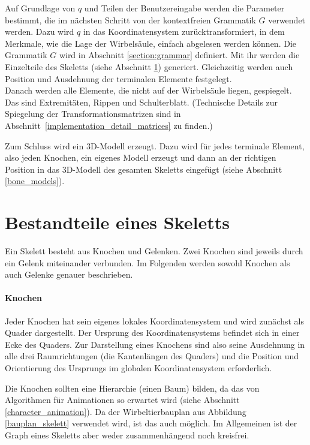 Auf Grundlage von $q$ und Teilen der Benutzereingabe werden die Parameter bestimmt, die im nächsten Schritt von der kontextfreien Grammatik $G$ verwendet werden. Dazu wird $q$ in das Koordinatensystem zurücktransformiert, in dem Merkmale, wie die Lage der Wirbelsäule, einfach abgelesen werden können. Die Grammatik $G$ wird in Abschnitt \ref{section:grammar} definiert. Mit ihr werden die Einzelteile des Skeletts (siehe Abschnitt \ref{skeleton_parts}) generiert. Gleichzeitig werden auch Position und Ausdehnung der terminalen Elemente festgelegt.\\
Danach werden alle Elemente, die nicht auf der Wirbelsäule liegen, gespiegelt. Das sind Extremitäten, Rippen und Schulterblatt. (Technische Details zur Spiegelung der Transformationsmatrizen sind in \mbox{Abschnitt \ref{implementation_detail_matrices}} zu finden.)

Zum Schluss wird ein 3D-Modell erzeugt. Dazu wird für jedes terminale Element, also jeden Knochen, ein eigenes Modell erzeugt und dann an der richtigen Position in das 3D-Modell des gesamten Skeletts eingefügt (siehe Abschnitt \ref{bone_models}). 


\section{Bestandteile eines Skeletts}
\label{skeleton_parts}

Ein Skelett besteht aus Knochen und Gelenken. Zwei Knochen sind jeweils durch ein Gelenk miteinander verbunden. Im Folgenden werden sowohl Knochen als auch Gelenke genauer beschrieben.

\paragraph{Knochen}
Jeder Knochen hat sein eigenes lokales Koordinatensystem und wird zunächst als Quader dargestellt. Der Ursprung des Koordinatensystems befindet sich in einer Ecke des Quaders.
Zur Darstellung eines Knochens sind also
seine Ausdehnung in alle drei Raumrichtungen (die Kantenlängen des Quaders) und die Position und Orientierung des Ursprungs im globalen Koordinatensystem erforderlich.

Die Knochen sollten eine Hierarchie (einen Baum) bilden, da das von Algorithmen für Animationen so erwartet wird (siehe Abschnitt \ref{character_animation}). Da der Wirbeltierbauplan aus Abbildung \ref{bauplan_skelett} verwendet wird, ist das auch möglich. Im Allgemeinen ist der Graph eines Skeletts aber weder zusammenhängend noch kreisfrei.


